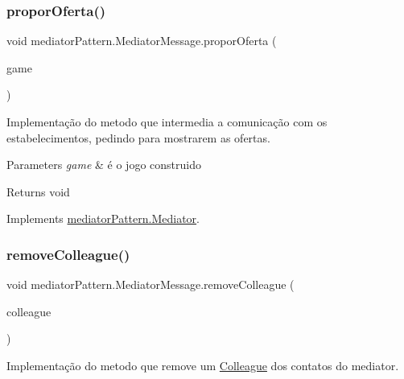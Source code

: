 \subsubsection{\texorpdfstring{proporOferta()}{proporOferta()}}
{\footnotesize\ttfamily void mediator\+Pattern.\+Mediator\+Message.\+propor\+Oferta (\begin{DoxyParamCaption}\item[{\mbox{\hyperlink{classtemplate_pattern_1_1soccer_game}{soccer\+Game}}}]{game }\end{DoxyParamCaption})}



Implementação do metodo que intermedia a comunicação com os estabelecimentos, pedindo para mostrarem as ofertas. 


\begin{DoxyParams}{Parameters}
{\em game} & é o jogo construido \\
\hline
\end{DoxyParams}
\begin{DoxyReturn}{Returns}
void 
\end{DoxyReturn}


Implements \mbox{\hyperlink{interfacemediator_pattern_1_1_mediator_ad5219430e61d5602b1f8b7f6b8b35632}{mediator\+Pattern.\+Mediator}}.

\mbox{\label{classmediator_pattern_1_1_mediator_message_a24da9666fc7c515b4b1ae19315f44e9c}} 
\subsubsection{\texorpdfstring{removeColleague()}{removeColleague()}}
{\footnotesize\ttfamily void mediator\+Pattern.\+Mediator\+Message.\+remove\+Colleague (\begin{DoxyParamCaption}\item[{\mbox{\hyperlink{classmediator_pattern_1_1_colleague}{Colleague}}}]{colleague }\end{DoxyParamCaption})}



Implementação do metodo que remove um \mbox{\hyperlink{classmediator_pattern_1_1_colleague}{Colleague}} dos contatos do mediator. 


